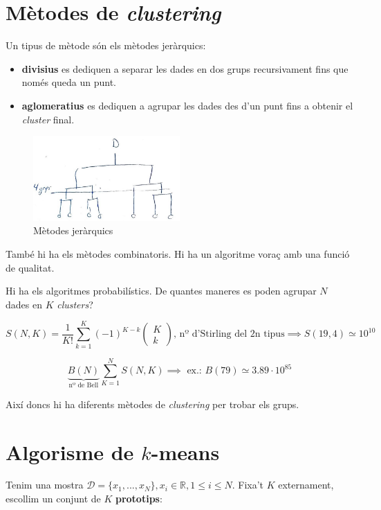 \section{Mètodes de \emph{clustering}}

Un tipus de mètode són els mètodes jeràrquics:
\begin{itemize}
	\item \textbf{divisius} es dediquen a separar les dades en dos grups recursivament fins que només queda un punt.
	\item \textbf{aglomeratius} es dediquen a agrupar les dades des d'un punt fins a obtenir el \emph{cluster} final.
\end{itemize}

\begin{figure}[H]
    \centering
    \includegraphics[width=0.5\textwidth]{tema_3/images/figura_3}
    \caption{Mètodes jeràrquics}
\end{figure}

També hi ha els mètodes combinatoris. Hi ha un algoritme voraç amb una funció de qualitat.

Hi ha els algoritmes probabilístics. De quantes maneres es poden agrupar $N$ dades en $K$ \emph{clusters}?

$$ 
S(N, K) = \frac{1}{K!} \sum_{k=1}^K (-1)^{K-k} 
\begin{pmatrix}
K \\ k
\end{pmatrix} 
\text{, nº d'Stirling del 2n tipus} \implies S(19,4) \simeq 10^{10} 
$$

$$ 
\underbrace{B(N)}_{\text{nº de Bell}} \sum_{K=1}^{N} S(N,K) \implies \text{ ex.: } B(79) \simeq 3.89·10^85 
$$

Així doncs hi ha diferents mètodes de \emph{clustering} per trobar els grups.

\section{Algorisme de $k$-means}

Tenim una mostra $\mathcal{D} = \{ x_1,..., x_N \} , x_i \in \mathbb{R}, 1 \le i \le N$. Fixa't $K$ externament, escollim un conjunt de $K$ \textbf{prototips}:

